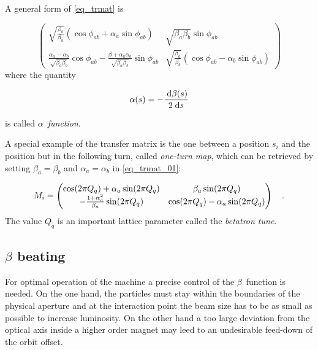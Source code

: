 A general form of \eqref{eq_trmat} is 

\begin{equation}
    \begin{pmatrix}
        \sqrt{\frac{\beta_b}{\beta_a}}(\cos\phi_{ab} + \alpha_a \sin\phi_{ab}) &
        \sqrt{\beta_a\beta_b} \sin\phi_{ab} \\
        \frac{\alpha_a - \alpha_b}{\sqrt{\beta_a\beta_b}}\cos\phi_{ab} - \frac{\beta+\alpha_a\alpha_b}{\sqrt{\beta_a\beta_b}}\sin\phi_{ab} &
        \sqrt{\frac{\beta_a}{\beta_b}}(\cos\phi_{ab} - \alpha_b\sin\phi_{ab})
    \end{pmatrix}
    \label{eq_trmat_01}
\end{equation}
where the quantity

\begin{equation}
    \alpha(s) = -\frac{\;\text{d} \beta(s)}{2 \;\text{d} s}
    \label{eq_alpha}
\end{equation}

is called $\alpha$~\emph{function}.

A special example of the transfer matrix is the one between a position $s_i$ and the position but in
the following turn, called \emph{one-turn map}, which can be retrieved by setting $\beta_a = \beta_b $
and $\alpha_a = \alpha_b$ in \eqref{eq_trmat_01}:

\begin{equation}
    M_i = \begin{pmatrix}
        \cos(2\pi Q_q) + \alpha_a \sin(2\pi Q_q) & \beta_a\sin(2\pi Q_q) \\
        -\frac{1+\alpha_a^2}{\beta_a}\sin(2\pi Q_q) & \cos(2\pi Q_q) - \alpha_a\sin(2\pi Q_q)
    \end{pmatrix}
    \quad .
\end{equation}
The value $Q_q$ is an important lattice parameter called the \emph{betatron tune}.

\subsection{$\beta$ beating}

For optimal operation of the machine a precise control of the $\beta$~function is needed. On the one
hand, the particles must stay within the boundaries of the physical aperture and 
at the interaction point the beam size has to be as small as possible to increase luminosity.
On the other hand a too large deviation from the optical axis inside a higher order magnet may leed to an undesirable
feed-down of the orbit offset.

